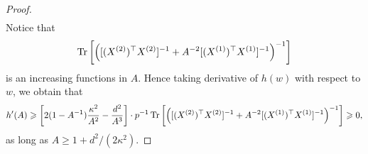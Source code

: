 \begin{proof}
\begin{align*}
\end{align*}
Notice that
$$\operatorname{Tr}\left[\left([(X^{(2)})^\top X^{(2)}]^{-1} + A^{-2} [(X^{(1)})^\top X^{(1)}]^{-1}\right)^{-1}\right]$$
is an increasing functions in $A$. Hence taking derivative of $h(w)$ with respect to $w$, we obtain that
\begin{align}\label{h'(A)1}
h'(A) \geqslant \left[2(1-A^{-1})\frac{\kappa^2}{A^2} - \frac{d^2}{A^3}\right] \cdot p^{-1} \operatorname{Tr}\left[\left([(X^{(2)})^\top X^{(2)}]^{-1} + A^{-2} [(X^{(1)})^\top X^{(1)}]^{-1}\right)^{-1}\right] \geqslant 0,
\end{align}
as long as $A \ge 1+d^2/(2\kappa^2)$.  

\end{proof}
